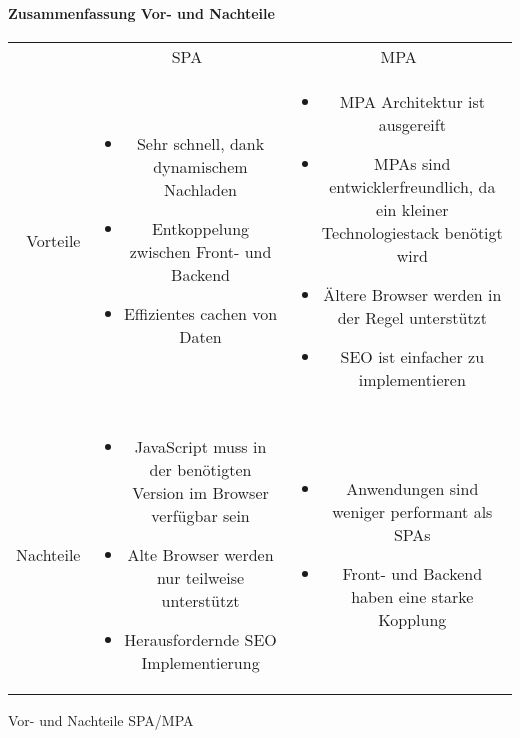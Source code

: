 \paragraph{Zusammenfassung Vor- und Nachteile} \label{para:Zusammenfassung_Vor-_und_Nachteile}
\mbox{} %
\begin{center}
	\begin{tabular}{rcc}
		& SPA & MPA \\
		Vorteile &
		\begin{minipage}[t]{0.4\textwidth}
			\begin{itemize}
				\item Sehr schnell, dank dynamischem Nachladen
				\item Entkoppelung zwischen Front- und Backend
				\item Effizientes cachen von Daten
			\end{itemize}
		\end{minipage} &
		\begin{minipage}[t]{0.4\textwidth}
			\begin{itemize}
				\item MPA Architektur ist ausgereift
				\item MPAs sind entwicklerfreundlich, da ein kleiner Technologiestack benötigt wird
				\item Ältere Browser werden in der Regel unterstützt
				\item SEO ist einfacher zu implementieren
			\end{itemize}
		\end{minipage}\\
		& & \\ %
		Nachteile &
		\begin{minipage}[t]{0.4\textwidth}
			\begin{itemize}
				\item JavaScript muss in der benötigten Version im Browser verfügbar sein
				\item Alte Browser werden nur teilweise unterstützt
				\item Herausfordernde SEO Implementierung
			\end{itemize}
		\end{minipage} &
		\begin{minipage}[t]{0.4\textwidth}
			\begin{itemize}
				\item Anwendungen sind weniger performant als SPAs
				\item Front- und Backend haben eine starke Kopplung
			\end{itemize}
		\end{minipage}
	\end{tabular}
\caption{Vor- und Nachteile SPA/MPA}
\label{tab:Vor-_und_Nachteile_SPA/MPA}
\end{center}


